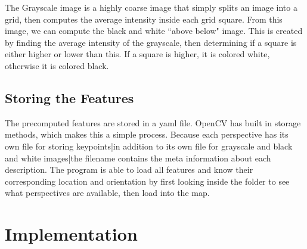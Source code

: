 \documentclass[a4paper,11pt]{article}
\begin{document}
The Grayscale image is a highly coarse image that simply splits an image into a grid, then computes the average intensity inside each grid square. From this image, we can compute the black and white ``above below" image. This is created by finding the average intensity of the grayscale, then determining if a square is either higher or lower than this. If a square is higher, it is colored white, otherwise it is colored black.

  \subsection{Storing the Features}
The precomputed features are stored in a yaml file. OpenCV has built in storage methods, which makes this a simple process. Because each perspective has its own file for storing keypoints|in addition to its own file for grayscale and black and white images|the filename contains the meta information about each description. The program is able to load all features and know their corresponding location and orientation by first looking inside the folder to see what perspectives are available, then load into the map.

\newpage

















  \section{Implementation}
\end{document}

